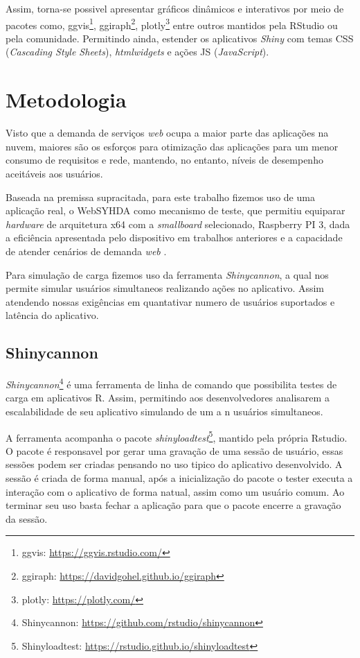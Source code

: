 \documentclass[12pt,english,brazil]{article}
\begin{document}
Assim, torna-se possivel apresentar gráficos dinâmicos e interativos por meio de pacotes como, ggvis\footnote{ggvis: \url{https://ggvis.rstudio.com/}}, ggiraph\footnote{ggiraph: \url{https://davidgohel.github.io/ggiraph}}, plotly\footnote{plotly: \url{https://plotly.com/}} entre outros mantidos pela RStudio ou pela comunidade. Permitindo ainda, estender os aplicativos \emph{Shiny} com temas CSS (\emph{Cascading Style Sheets}), \emph{htmlwidgets} e ações JS (\emph{JavaScript}).


\section{Metodologia} \label{sec:metodologia}

Visto que a demanda de serviços \textit{web} ocupa a maior parte das aplicações na nuvem, maiores são os esforços para otimização das aplicações para um menor consumo de requisitos e rede, mantendo, no entanto, níveis de desempenho aceitáveis aos usuários. 

Baseada na premissa supracitada, para este trabalho fizemos uso de uma aplicação real, o WebSYHDA como mecanismo de teste, que permitiu equiparar \emph{hardware} de arquitetura x64 com a \emph{smallboard} selecionado, Raspberry PI 3, dada a eficiência apresentada pelo dispositivo em trabalhos anteriores e a capacidade de atender cenários de demanda \emph{web} \cite{silva2019estudo}.

Para simulação de carga fizemos uso da ferramenta \emph{Shinycannon}, a qual nos permite simular usuários simultaneos realizando ações no aplicativo. Assim atendendo nossas exigências em quantativar numero de usuários suportados e latência do aplicativo.




\subsection{Shinycannon} \label{sec:Shinycannon}

\textit{Shinycannon}\footnote{Shinycannon: \url{https://github.com/rstudio/shinycannon}} é uma ferramenta de linha de comando que possibilita testes de carga em aplicativos R. Assim, permitindo aos desenvolvedores analisarem a escalabilidade de seu aplicativo simulando de um a n usuários simultaneos.

A ferramenta acompanha o pacote \textit{shinyloadtest}\footnote{Shinyloadtest: \url{https://rstudio.github.io/shinyloadtest}}, mantido pela própria Rstudio. O pacote é responsavel por gerar uma gravação de uma sessão de usuário, essas sessões podem ser criadas pensando no uso tipico do aplicativo desenvolvido\cite{shinyloadtest}. A sessão é criada de forma manual, após a inicialização do pacote o tester executa a interação com o aplicativo de forma natual, assim como um usuário comum. Ao terminar seu uso basta fechar a aplicação para que o pacote encerre a gravação da sessão.
\end{document}
